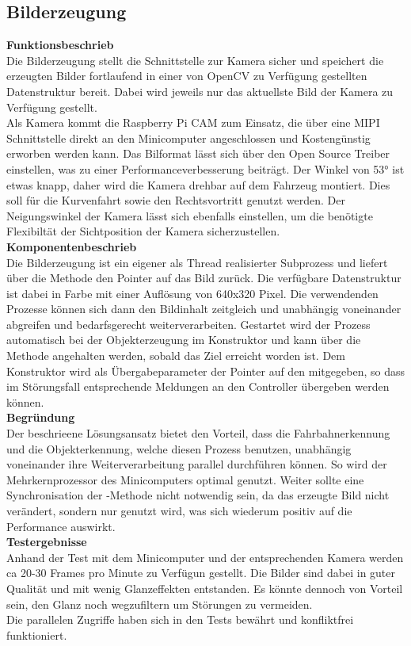 \subsection{Bilderzeugung}

\textbf{Funktionsbeschrieb}\\[0.2cm]
Die Bilderzeugung stellt die Schnittstelle zur Kamera sicher und speichert die erzeugten Bilder fortlaufend in einer von OpenCV zu Verfügung gestellten Datenstruktur bereit. Dabei wird jeweils nur das aktuellste Bild der Kamera zu Verfügung gestellt.\\
Als Kamera kommt die Raspberry Pi CAM zum Einsatz, die über eine MIPI Schnittstelle direkt an den Minicomputer angeschlossen und Kostengünstig erworben werden kann. Das Bilformat lässt sich über den Open Source Treiber einstellen, was zu einer Performanceverbesserung beiträgt. Der Winkel von 53° ist etwas knapp, daher wird die Kamera drehbar auf dem Fahrzeug montiert. Dies soll für die Kurvenfahrt sowie den Rechtsvortritt genutzt werden. Der Neigungswinkel der Kamera lässt sich ebenfalls einstellen, um die benötigte Flexibiltät der Sichtposition der Kamera sicherzustellen.\\[0.2cm]
\textbf{Komponentenbeschrieb}\\[0.2cm]
Die Bilderzeugung ist ein eigener als Thread realisierter Subprozess und liefert über die Methode  den Pointer auf das Bild zurück. Die verfügbare Datenstruktur ist dabei  in Farbe mit einer Auflösung von 640x320 Pixel. Die verwendenden Prozesse können sich dann den Bildinhalt zeitgleich und unabhängig voneinander abgreifen und bedarfsgerecht weiterverarbeiten. Gestartet wird der Prozess automatisch bei der Objekterzeugung im Konstruktor und kann über die Methode  angehalten werden, sobald das Ziel erreicht worden ist. Dem Konstruktor wird als Übergabeparameter der Pointer auf den  mitgegeben, so dass im Störungsfall entsprechende Meldungen an den Controller übergeben werden können.\\[0.2cm]
\textbf{Begründung}\\[0.2cm]
Der beschrieene Lösungsansatz bietet den Vorteil, dass die Fahrbahnerkennung und die Objekterkennung, welche diesen Prozess benutzen, unabhängig voneinander ihre Weiterverarbeitung parallel durchführen können. So wird der Mehrkernprozessor des Minicomputers optimal genutzt. Weiter  sollte eine Synchronisation der -Methode nicht notwendig sein, da das erzeugte Bild nicht verändert, sondern nur genutzt wird, was sich wiederum positiv auf die Performance auswirkt.\\[0.2cm]
\textbf{Testergebnisse}\\[0.2cm]
Anhand der Test mit dem Minicomputer und der entsprechenden Kamera werden ca 20-30 Frames pro Minute zu Verfügun gestellt. Die Bilder sind dabei in guter Qualität und mit wenig Glanzeffekten entstanden. Es könnte dennoch von Vorteil sein, den Glanz noch wegzufiltern um Störungen zu vermeiden.\\
Die parallelen Zugriffe haben sich in den Tests bewährt und konfliktfrei funktioniert.